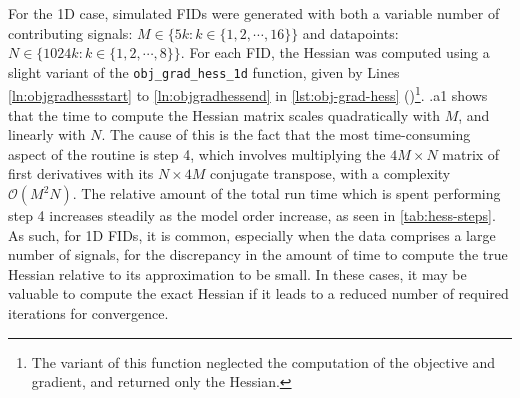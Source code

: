 For the \ac{1D} case, simulated \acp{FID} were generated
with both a variable number of contributing signals: $M \in \lbrace 5k : k \in
\lbrace 1, 2, \cdots, 16 \rbrace \rbrace$ and datapoints: $N \in \lbrace 1024k
: k \in \lbrace 1, 2, \cdots, 8 \rbrace \rbrace$. For each \ac{FID}, the Hessian
was computed using a slight variant of the \texttt{obj\_grad\_hess\_1d}
function, given by Lines \ref{ln:objgradhessstart} to
\ref{ln:objgradhessend} in \cref{lst:obj-grad-hess}
()\footnote{
    The variant of this function neglected the computation of the objective and
    gradient, and returned only the Hessian.
}. .a1 shows that the
time to compute the Hessian matrix scales quadratically with $M$, and
linearly with $N$. The cause of this is the fact that the most time-consuming
aspect of the routine is step 4, which involves multiplying the $4M \times N$
matrix of first derivatives with its  $N \times 4M$ conjugate transpose, with a
complexity $\mathcal{O}(M^2N)$. The relative amount of the total run time which
is spent performing step 4 increases steadily as the model order increase, as
seen in \cref{tab:hess-steps}.
As such, for \ac{1D} \acp{FID}, it is
common, especially when the data comprises a large number of
signals, for the discrepancy in the amount of time to compute the true
Hessian relative to its approximation to be small. In these cases, it may be
valuable to compute the exact Hessian if it leads to a reduced number of
required iterations for convergence.
